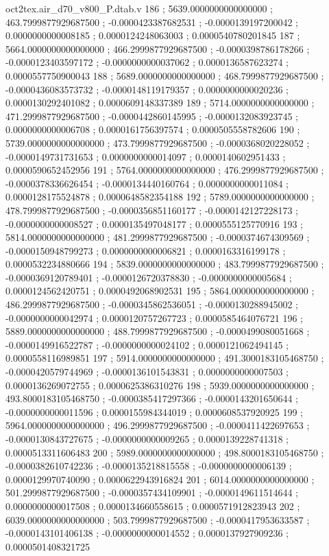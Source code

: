 \begin{filecontents}[overwrite]{oct2tex.air_d70_v800_P.dtab.v}
186 ; 5639.0000000000000000 ; 463.7999877929687500 ; -0.0000423387682531 ; -0.0000139197200042 ; 0.0000000000008185 ; 0.0000124248063003 ; 0.0000540780201845
187 ; 5664.0000000000000000 ; 466.2999877929687500 ; -0.0000398786178266 ; -0.0000123403597172 ; -0.0000000000037062 ; 0.0000136587623274 ; 0.0000557750900043
188 ; 5689.0000000000000000 ; 468.7999877929687500 ; -0.0000436083573732 ; -0.0000148119179357 ; 0.0000000000020236 ; 0.0000130292401082 ; 0.0000609148337389
189 ; 5714.0000000000000000 ; 471.2999877929687500 ; -0.0000442860145995 ; -0.0000132083923745 ; 0.0000000000006708 ; 0.0000161756397574 ; 0.0000505558782606
190 ; 5739.0000000000000000 ; 473.7999877929687500 ; -0.0000368020228052 ; -0.0000149731731653 ; 0.0000000000014097 ; 0.0000140602951433 ; 0.0000590652452956
191 ; 5764.0000000000000000 ; 476.2999877929687500 ; -0.0000378336626454 ; -0.0000134440160764 ; 0.0000000000011084 ; 0.0000128175524878 ; 0.0000648582354188
192 ; 5789.0000000000000000 ; 478.7999877929687500 ; -0.0000356851160177 ; -0.0000142127228173 ; -0.0000000000008527 ; 0.0000135497048177 ; 0.0000555125770916
193 ; 5814.0000000000000000 ; 481.2999877929687500 ; -0.0000374674309569 ; -0.0000150948799273 ; 0.0000000000006821 ; 0.0000163316199178 ; 0.0000532234880666
194 ; 5839.0000000000000000 ; 483.7999877929687500 ; -0.0000369120789401 ; -0.0000126720378830 ; -0.0000000000005684 ; 0.0000124562420751 ; 0.0000492068902531
195 ; 5864.0000000000000000 ; 486.2999877929687500 ; -0.0000345862536051 ; -0.0000130288945002 ; -0.0000000000042974 ; 0.0000120757267723 ; 0.0000585464076721
196 ; 5889.0000000000000000 ; 488.7999877929687500 ; -0.0000499080051668 ; -0.0000149916522787 ; -0.0000000000024102 ; 0.0000121062494145 ; 0.0000558116989851
197 ; 5914.0000000000000000 ; 491.3000183105468750 ; -0.0000420579744969 ; -0.0000136101543831 ; 0.0000000000007503 ; 0.0000136269072755 ; 0.0000625386310276
198 ; 5939.0000000000000000 ; 493.8000183105468750 ; -0.0000385417297366 ; -0.0000143201650644 ; -0.0000000000011596 ; 0.0000155984344019 ; 0.0000608537920925
199 ; 5964.0000000000000000 ; 496.2999877929687500 ; -0.0000411422697653 ; -0.0000130843727675 ; -0.0000000000009265 ; 0.0000139228741318 ; 0.0000513311606483
200 ; 5989.0000000000000000 ; 498.8000183105468750 ; -0.0000382610742236 ; -0.0000135218815558 ; -0.0000000000006139 ; 0.0000129970740090 ; 0.0000622943916824
201 ; 6014.0000000000000000 ; 501.2999877929687500 ; -0.0000357434109901 ; -0.0000149611514644 ; 0.0000000000017508 ; 0.0000134660558615 ; 0.0000571912823943
202 ; 6039.0000000000000000 ; 503.7999877929687500 ; -0.0000417953633587 ; -0.0000143101406138 ; -0.0000000000014552 ; 0.0000137927909236 ; 0.0000501408321725

\end{filecontents}
